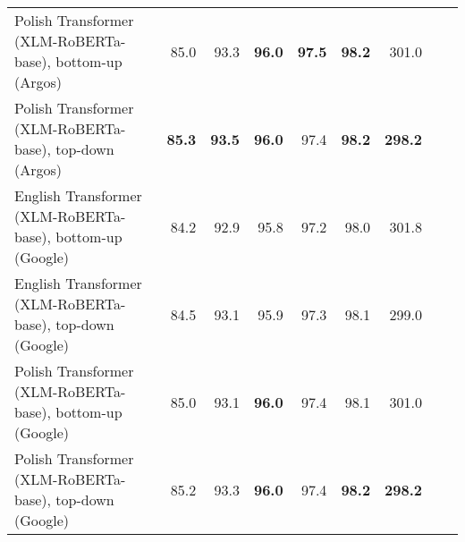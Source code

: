 \begin{table}[ht!]
{\begin{tabular}{lrrrrrrrr}
  Polish Transformer (XLM-RoBERTa-base), bottom-up (Argos) & 85.0 & 93.3 & \textbf{96.0} & \textbf{97.5} & \textbf{98.2} & 301.0 \\ 
  Polish Transformer (XLM-RoBERTa-base), top-down (Argos) & \textbf{85.3} & \textbf{93.5} & \textbf{96.0} & 97.4 & \textbf{98.2} & \textbf{298.2} \\ 
  English Transformer (XLM-RoBERTa-base), bottom-up (Google) & 84.2 & 92.9 & 95.8 & 97.2 & 98.0 & 301.8 \\ 
  English Transformer (XLM-RoBERTa-base), top-down (Google) & 84.5 & 93.1 & 95.9 & 97.3 & 98.1 & 299.0 \\ 
  Polish Transformer (XLM-RoBERTa-base), bottom-up (Google) & 85.0 & 93.1 & \textbf{96.0} & 97.4 & 98.1 & 301.0 \\ 
  Polish Transformer (XLM-RoBERTa-base), top-down (Google) & 85.2 & 93.3 & \textbf{96.0} & 97.4 & \textbf{98.2} & \textbf{298.2} \\ 
   \hline
\end{tabular}
}
\end{table}




